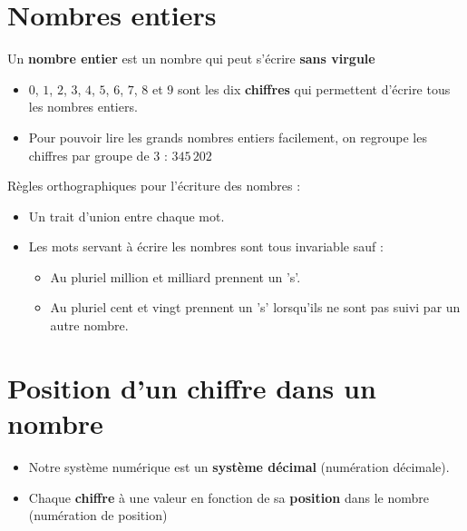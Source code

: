 \begin{pageCours} 


\section{Nombres entiers}

\begin{Def}
Un \textbf{nombre entier} est un nombre qui peut s'écrire \textbf{sans virgule}
\end{Def}

\begin{Rqs}
\begin{itemize}
\item $0$, $1$, $2$, $3$, $4$, $5$, $6$, $7$, $8$ et $9$ sont les dix \textbf{chiffres} qui permettent d'écrire tous les nombres entiers.
\item Pour pouvoir lire les grands nombres entiers facilement, on regroupe les chiffres par groupe de 3 : $345\,202$
\end{itemize}
\end{Rqs}

\begin{Reg}
Règles orthographiques pour l'écriture des nombres :
\begin{itemize}[leftmargin=*]
    \item Un trait d'union entre chaque mot.
    \item Les mots servant à écrire les nombres sont tous invariable sauf :
    \begin{itemize}
        \item Au pluriel million et milliard prennent un 's'.
        \item Au pluriel cent et vingt prennent un 's' lorsqu'ils ne sont pas suivi par un autre nombre.
    \end{itemize}
\end{itemize}
\end{Reg}



\section{Position d'un chiffre dans un nombre}

\begin{Def}
\begin{itemize}[leftmargin=*]
\item Notre système numérique est un \textbf{système décimal} (numération décimale).
\item Chaque \textbf{chiffre} à une valeur en fonction de sa \textbf{position} dans le nombre (numération de position)
\end{itemize}
\end{Def}


\end{pageCours}
